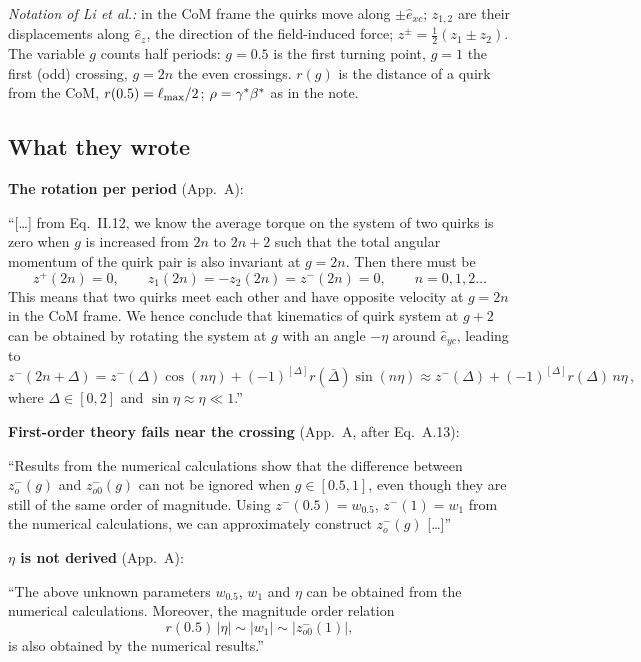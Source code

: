 \documentclass[11pt]{article}
\begin{document}
\emph{Notation of Li et al.:} in the CoM frame the quirks move along $\pm\hat e_{xc}$; $z_{1,2}$ are their displacements
along $\hat e_z$, the direction of the field-induced force; $z^\pm=\tfrac12(z_1\pm z_2)$. The variable $g$ counts half
periods: $g=0.5$ is the first turning point, $g=1$ the first (odd) crossing, $g=2n$ the even crossings. $r(g)$ is the
distance of a quirk from the CoM, $r(0.5)=\ell_{\max}/2$; $\rho=\gamma^*\beta^*$ as in the note.

\subsection{What they wrote}
\noindent\textbf{The rotation per period} (App.~A):
\begin{srcquote}
``[\dots] from Eq.~II.12, we know the average torque on the system of two quirks is zero when $g$ is increased from $2n$
to $2n+2$ such that the total angular momentum of the quirk pair is also invariant at $g=2n$. Then there must be
\[
  z^+(2n)=0,\qquad z_1(2n)=-z_2(2n)=z^-(2n)=0,\qquad n=0,1,2\dots\tag{Li20 A.5}
\]
This means that two quirks meet each other and have opposite velocity at $g=2n$ in the CoM frame. We hence conclude that
kinematics of quirk system at $g+2$ can be obtained by rotating the system at $g$ with an angle $-\eta$ around $\hat e_{yc}$,
leading to
\[
  z^-(2n+\Delta)=z^-(\Delta)\cos(n\eta)+(-1)^{[\Delta]}r(\bar\Delta)\sin(n\eta)\approx z^-(\Delta)+(-1)^{[\Delta]}r(\Delta)\,n\eta\,,\tag{Li20 A.6}
\]
where $\Delta\in[0,2]$ and $\sin\eta\approx\eta\ll1$.''
\end{srcquote}

\noindent\textbf{First-order theory fails near the crossing} (App.~A, after Eq.~A.13):
\begin{srcquote}
``Results from the numerical calculations show that the difference between $z^-_o(g)$ and $z^-_{o0}(g)$ can not be
ignored when $g\in[0.5,1]$, even though they are still of the same order of magnitude. Using $z^-(0.5)=w_{0.5}$,
$z^-(1)=w_1$ from the numerical calculations, we can approximately construct $z^-_o(g)$ [\dots]''
\end{srcquote}

\noindent\textbf{$\eta$ is not derived} (App.~A):
\begin{srcquote}
``The above unknown parameters $w_{0.5}$, $w_1$ and $\eta$ can be obtained from the numerical calculations. Moreover, the
magnitude order relation
\[
  r(0.5)\,|\eta|\sim|w_1|\sim|z^-_{o0}(1)|,\tag{Li20 A.17}
\]
is also obtained by the numerical results.''
\end{srcquote}
\end{document}
